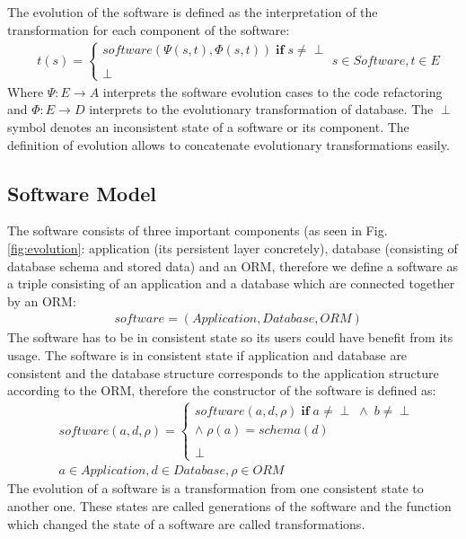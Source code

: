 \documentclass[runningheads]{comsis}
\begin{document}
The evolution of the software is defined as the interpretation of the transformation for each component of the software:
\begin{align}
& t(s) = \begin{cases}
software(\Psi(s, t), \Phi(s,t)) \; \mathbf{if} \; s \neq \perp \\\\
 	\perp
\end{cases}
s \in Software, t \in E \nonumber
\end{align}
Where $\Psi : E \rightarrow A $ interprets the software evolution cases to the code refactoring and $\Phi : E \rightarrow D $ interprets to the evolutionary transformation of database. The $\perp$ symbol denotes an inconsistent state of a software or its component. The definition of evolution allows to concatenate evolutionary transformations easily. 

\subsection{Software Model}
The software consists of three important components (as seen in Fig. \ref{fig:evolution}: application (its persistent layer concretely), database (consisting of database schema and stored data) and an ORM, therefore we define a software as a triple consisting of an application and a database which are connected together by an ORM:
\begin{align}
& software = ( Application, Database, ORM )
\end{align}
The software has to be in consistent state so its users could have benefit from its usage. The software is in consistent state if application and database are consistent and the database structure corresponds to the application structure according to the ORM, therefore the constructor of the software is defined as:
\begin{align}
& software(a, d, \rho) = \begin{cases}
 software(a, d, \rho) \; \textbf{if} \; a \neq \perp \; \wedge \; b \neq \perp \\ \wedge \; \rho(a) = schema(d) 
 \\\\
 \perp
 \end{cases}\\
& a \in Application, d \in Database, \rho \in ORM \nonumber
\end{align}
The evolution of a software is a transformation from one consistent state to another one. These states are called generations of the software and the function which changed the state of a software are called transformations. 
\end{document}
